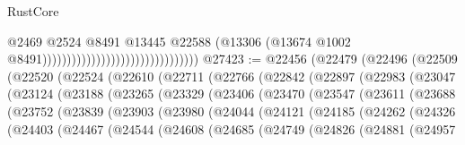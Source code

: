 \begin{lexlean}{RustCore}
\begin{coremodule}
                                                                @2469
                                                                @2524
                                                                @8491
                                                                @13445
                                                                @22588
                                                                (@13306
                                                                  (@13674
                                                                    @1002
                                                                    @8491))))))))))))))))))))))))))))))))
@27423 := @22456
    (@22479
      (@22496
        (@22509
          (@22520
            (@22524
              (@22610
                (@22711
                  (@22766
                    (@22842
                      (@22897
                        (@22983
                          (@23047
                            (@23124
                              (@23188
                                (@23265
                                  (@23329
                                    (@23406
                                      (@23470
                                        (@23547
                                          (@23611
                                            (@23688
                                              (@23752
                                                (@23839
                                                  (@23903
                                                    (@23980
                                                      (@24044
                                                        (@24121
                                                          (@24185
                                                            (@24262
                                                              (@24326
                                                                (@24403
                                                                  (@24467
                                                                    (@24544
                                                                      (@24608
                                                                        (@24685
                                                                          (@24749
                                                                            (@24826
                                                                              (@24881
                                                                                (@24957

\end{coremodule}
\end{lexlean}
